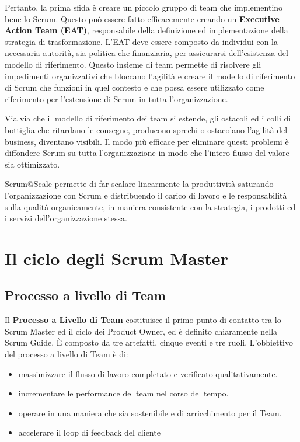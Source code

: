 \documentclass[italian,12pt,a4paper,parskip=full]{scrartcl}
\begin{document}
Pertanto, la prima sfida è creare un piccolo gruppo di team che implementino bene lo Scrum. Questo può essere fatto efficacemente creando un \textbf{Executive Action Team (EAT)}, responsabile della definizione ed implementazione della strategia di trasformazione. L'EAT deve essere composto da individui con la necessaria autorità, sia politica che finanziaria, per assicurarsi dell'esistenza del modello di riferimento. Questo insieme di team permette di risolvere gli impedimenti organizzativi che bloccano l'agilità e creare il modello di riferimento di Scrum che funzioni in quel contesto e che possa essere utilizzato come riferimento per l'estensione di Scrum in tutta l'organizzazione.

Via via che il modello di riferimento dei team si estende, gli ostacoli ed i colli di bottiglia che ritardano le consegne, producono sprechi o ostacolano l'agilità del business,  diventano visibili. Il modo più efficace per eliminare questi problemi è diffondere Scrum su tutta l'organizzazione in modo che l'intero flusso del valore sia ottimizzato.

Scrum@Scale permette di far scalare linearmente la produttività saturando l'organizzazione con Scrum e distribuendo il carico di lavoro e le responsabilità sulla qualità organicamente, in maniera consistente con la strategia, i prodotti ed i servizi dell'organizzazione stessa.

\section{Il ciclo degli Scrum Master}
\subsection{Processo a livello di Team}
Il \textbf{Processo a Livello di Team} costituisce il primo punto di contatto tra lo Scrum Master ed il ciclo dei Product Owner, ed è definito chiaramente nella Scrum Guide. È composto da tre artefatti, cinque eventi e tre ruoli. L'obbiettivo del processo a livello di Team è di:
\begin{itemize}
\item massimizzare il flusso di lavoro completato e verificato qualitativamente.
\item incrementare le performance del team nel corso del tempo.
\item operare in una maniera che sia sostenibile e di arricchimento per il Team.
\item accelerare il loop di feedback del cliente
\end{itemize}
\end{document}

